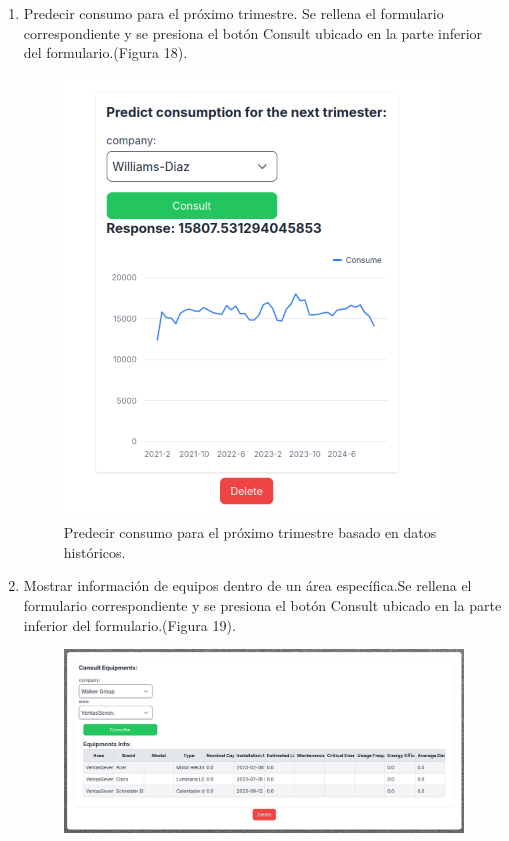\documentclass{article}
\begin{document}
\begin{enumerate}
\begin{figure}[h!]
    \end{figure}
    \item Predecir consumo para el próximo trimestre. Se rellena el formulario correspondiente y se presiona el botón Consult ubicado en la parte inferior del formulario.(Figura 18).
    \begin{figure}[h!]
        \centering
        \includegraphics[width= 10cm]{predict_consume.png}
        \caption{Predecir consumo para el próximo trimestre basado en datos históricos.}
    \end{figure}
    \item Mostrar información de equipos dentro de un área específica.Se rellena el formulario correspondiente y se presiona el botón Consult ubicado en la parte inferior del formulario.(Figura 19).
    \begin{figure}[h!]
        \centering
        \includegraphics[width= 14cm]{consult_equipments.png}

\end{figure}
\end{enumerate}
\end{document}
